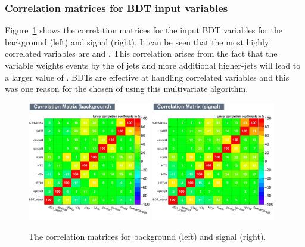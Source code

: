 \subsubsection{Correlation matrices for BDT input variables}


Figure~\ref{fig:corrMat} shows the correlation matrices for the input BDT variables for the background \ttbar (left) and signal \tttt (right). It can be seen that the most highly correlated variables are \njetsw and \redhadmass. This correlation arises from the fact that the \njetsw variable weights events by the \pt of jets and more additional higher-\pt jets will lead to a larger value of \redhadmass. BDTs are effective at handling correlated variables and this was one reason for the chosen of using this multivariate algorithm.

\begin{figure}[ht!]
    \includegraphics[width=0.48\textwidth]{images/Run2/CorrelationMatrixB.pdf}
    \includegraphics[width=0.48\textwidth]{images/Run2/CorrelationMatrixS.pdf}
    \caption{The correlation matrices for background (left) and signal (right).}
    \label{fig:corrMat}
\end{figure}

